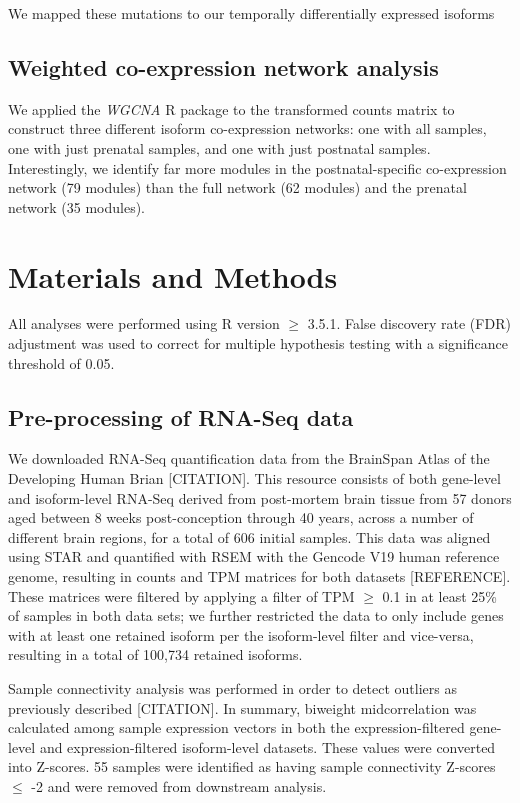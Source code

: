 We mapped these mutations to our temporally differentially expressed isoforms 

\subsection{Weighted co-expression network analysis}

We applied the \textit{WGCNA} R package to the transformed counts matrix to construct three different isoform co-expression networks: one with all samples, one with just prenatal samples, and one with just postnatal samples. Interestingly, we identify far more modules in the postnatal-specific co-expression network (79 modules) than the full network (62 modules) and the prenatal network (35 modules).

\section{Materials and Methods}
All analyses were performed using R version $\geq$ 3.5.1. False discovery rate (FDR) adjustment was used to correct for multiple hypothesis testing with a significance threshold of 0.05.

\subsection{Pre-processing of RNA-Seq data}
We downloaded RNA-Seq quantification data from the BrainSpan Atlas of the Developing Human Brian [CITATION]. This resource consists of both gene-level and isoform-level RNA-Seq derived from post-mortem brain tissue from 57 donors aged between 8 weeks post-conception through 40 years, across a number of different brain regions, for a total of 606 initial samples. This data was aligned using STAR and quantified with RSEM with the Gencode V19 human reference genome, resulting in counts and TPM matrices for both datasets [REFERENCE]. These matrices were filtered by applying a filter of TPM $\geq$ 0.1 in at least 25\% of samples in both data sets; we further restricted the data to only include genes with at least one retained isoform per the isoform-level filter and vice-versa, resulting in a total of 100,734 retained isoforms.\par

Sample connectivity analysis was performed in order to detect outliers as previously described [CITATION]. In summary, biweight midcorrelation was calculated among sample expression vectors in both the expression-filtered gene-level and expression-filtered isoform-level datasets. These values were converted into Z-scores. 55 samples were identified as having sample connectivity Z-scores $\leq$ -2 and were removed from downstream analysis.

